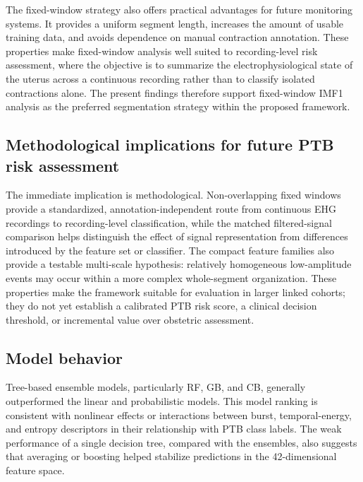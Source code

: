 \documentclass[10pt,letterpaper]{article}
\begin{document}
The fixed-window strategy also offers practical advantages for future monitoring systems. It provides a uniform segment length, increases the amount of usable training data, and avoids dependence on manual contraction annotation. These properties make fixed-window analysis well suited to recording-level risk assessment, where the objective is to summarize the electrophysiological state of the uterus across a continuous recording rather than to classify isolated contractions alone. The present findings therefore support fixed-window IMF1 analysis as the preferred segmentation strategy within the proposed framework.

\subsection*{Methodological implications for future PTB risk assessment}
The immediate implication is methodological. Non-overlapping fixed windows provide a standardized, annotation-independent route from continuous EHG recordings to recording-level classification, while the matched filtered-signal comparison helps distinguish the effect of signal representation from differences introduced by the feature set or classifier. The compact feature families also provide a testable multi-scale hypothesis: relatively homogeneous low-amplitude events may occur within a more complex whole-segment organization. These properties make the framework suitable for evaluation in larger linked cohorts; they do not yet establish a calibrated PTB risk score, a clinical decision threshold, or incremental value over obstetric assessment.

\subsection*{Model behavior}
Tree-based ensemble models, particularly RF, GB, and CB, generally outperformed the linear and probabilistic models. This model ranking is consistent with nonlinear effects or interactions between burst, temporal-energy, and entropy descriptors in their relationship with PTB class labels. The weak performance of a single decision tree, compared with the ensembles, also suggests that averaging or boosting helped stabilize predictions in the 42-dimensional feature space.
\end{document}
